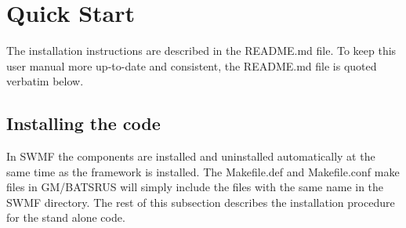 \section{Quick Start \label{section:quick_start}}

The installation instructions are described in the README.md file.
To keep this user manual more up-to-date and consistent,
the README.md file is quoted verbatim below.


\subsection{Installing the code}

In SWMF the components are installed and uninstalled automatically 
at the same time as the framework is installed.
The Makefile.def and Makefile.conf make files in GM/BATSRUS will 
simply include the files with the same name in the SWMF directory.
The rest of this subsection describes the installation procedure
for the stand alone code.
 
